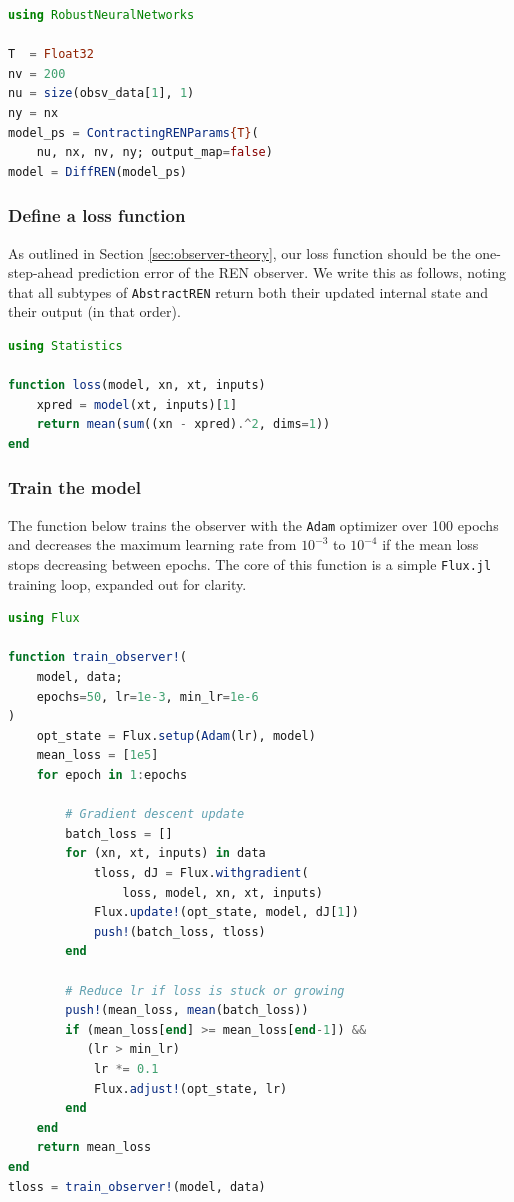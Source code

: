 \begin{lstlisting}[language = Julia]
using RobustNeuralNetworks

T  = Float32
nv = 200
nu = size(obsv_data[1], 1)
ny = nx
model_ps = ContractingRENParams{T}(
    nu, nx, nv, ny; output_map=false)
model = DiffREN(model_ps)
\end{lstlisting}

\subsubsection{Define a loss function} \label{sec:observer-loss}

As outlined in Section \ref{sec:observer-theory}, our loss function should be the one-step-ahead prediction error of the REN observer. We write this as follows, noting that all subtypes of \verb|AbstractREN| return both their updated internal state and their output (in that order).
\begin{lstlisting}[language = Julia]
using Statistics

function loss(model, xn, xt, inputs)
    xpred = model(xt, inputs)[1]
    return mean(sum((xn - xpred).^2, dims=1))
end
\end{lstlisting}

\subsubsection{Train the model} \label{sec:observer-train}

The function below trains the observer with the \verb|Adam| optimizer over 100 epochs and decreases the maximum learning rate from $10^{-3}$ to $10^{-4}$ if the mean loss stops decreasing between epochs. The core of this function is a simple \verb|Flux.jl| training loop, expanded out for clarity.
\begin{lstlisting}[language = Julia]
using Flux

function train_observer!(
    model, data; 
    epochs=50, lr=1e-3, min_lr=1e-6
)
    opt_state = Flux.setup(Adam(lr), model)
    mean_loss = [1e5]
    for epoch in 1:epochs

        # Gradient descent update
        batch_loss = []
        for (xn, xt, inputs) in data
            tloss, dJ = Flux.withgradient(
                loss, model, xn, xt, inputs)
            Flux.update!(opt_state, model, dJ[1])
            push!(batch_loss, tloss)
        end

        # Reduce lr if loss is stuck or growing
        push!(mean_loss, mean(batch_loss))
        if (mean_loss[end] >= mean_loss[end-1]) && 
           (lr > min_lr)
            lr *= 0.1
            Flux.adjust!(opt_state, lr)
        end
    end
    return mean_loss
end
tloss = train_observer!(model, data)
\end{lstlisting}


